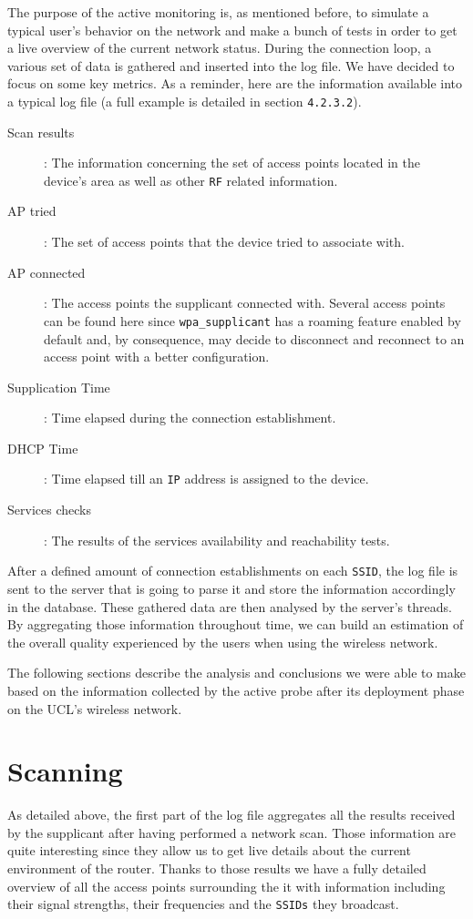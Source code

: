 The purpose of the active monitoring is, as mentioned before, to simulate a typical user's behavior on the network and make a bunch of tests in order to get a live overview of the current network status. During the connection loop, a various set of data is gathered and inserted into the log file. We have decided to focus on some key metrics. As a reminder, here are the information available into a typical log file (a full example is detailed in section \texttt{4.2.3.2}).

\begin{description}
	\item[Scan results]: The information concerning the set of access points located in the device's area as well as other \texttt{RF} related information.
	\item[AP tried]: The set of access points that the device tried to associate with.
	\item[AP connected]: The access points the supplicant connected with. Several access points can be found here since \texttt{wpa\_supplicant} has a roaming feature enabled by default and, by consequence, may decide to disconnect and reconnect to an access point with a better configuration.
	\item[Supplication Time]: Time elapsed during the connection establishment.
	\item [DHCP Time]: Time elapsed till an \texttt{IP} address is assigned to the device.
	\item [Services checks]: The results of the services availability and reachability tests.
\end{description}

After a defined amount of connection establishments on each \texttt{SSID}, the log file is sent to the server that is going to parse it and store the information accordingly in the database. These gathered data are then analysed by the server's threads. By aggregating those information throughout time, we can build an estimation of the overall quality experienced by the users when using the wireless network.

The following sections describe the analysis and conclusions we were able to make based on the information collected by the active probe after its deployment phase on the UCL's wireless network.


\section{Scanning}
As detailed above, the first part of the log file aggregates all the results received by the supplicant after having performed a network scan. Those information are quite interesting since they allow us to get live details about the current environment of the router. Thanks to those results we have a fully detailed overview of all the access points surrounding the it with information including their signal strengths, their frequencies and the \texttt{SSIDs} they broadcast.


